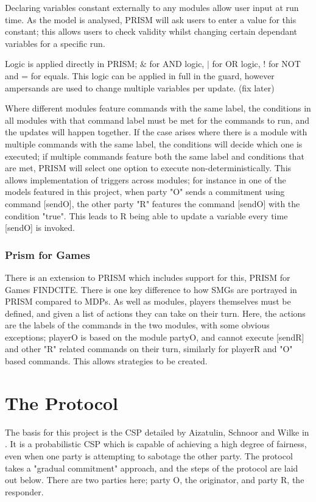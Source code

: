 \documentclass{l4proj}
\begin{document}
Declaring variables constant externally to any modules allow user input at run time. As the model is analysed, PRISM will ask users to enter a value for this constant; this allows users to check validity whilst changing certain dependant variables for a specific run.

Logic is applied directly in PRISM; $ \& $ for AND logic, $ \mid $ for OR logic, ! for NOT and = for equals. This logic can be applied in full in the guard, however ampersands are used to change multiple variables per update. (fix later)

Where different modules feature commands with the same label, the conditions in all modules with that command label must be met for the commands to run, and the updates will happen together. If the case arises where there is a module with multiple commands with the same label, the conditions will decide which one is executed; if multiple commands feature both the same label and conditions that are met, PRISM will select one option to execute non-deterministically. This allows implementation of triggers across modules; for instance in one of the models featured in this project, when party "O" sends a commitment using command [sendO], the other party "R" features the command [sendO] with the condition "true". This leads to R being able to update a variable every time [sendO] is invoked.

\subsection{Prism for Games}
There is an extension to PRISM which includes support for this, PRISM for Games {FINDCITE}. There is one key difference to how SMGs are portrayed in PRISM compared to MDPs. As well as modules, players themselves must be defined, and given a list of actions they can take on their turn. Here, the actions are the labels of the commands in the two modules, with some obvious exceptions; playerO is based on the module partyO, and cannot execute [sendR] and other "R" related commands on their turn, similarly for playerR and "O" based commands. This allows strategies to be created.


\chapter{The Protocol}
The basis for this project is the CSP detailed by Aizatulin, Schnoor and Wilke in \cite{ASW09}. It is a probabilistic CSP which is capable of achieving a high degree of fairness, even when one party is attempting to sabotage the other party. The protocol takes a "gradual commitment" approach, and the steps of the protocol are laid out below. There are two parties here; party O, the originator, and party R, the responder.
\end{document}
